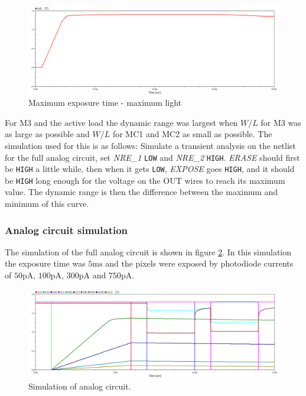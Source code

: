 \begin{figure}
    \centering
    \includegraphics[width=\textwidth]{graphs/maxExp_maxLight.png}
    \caption{Maximum exposure time - maximum light}
    \label{fig:max-max}
\end{figure}

For M3 and the active load the dynamic range was largest when $W/L$ for M3 was as large as possible and $W/L$ for MC1 and MC2 as small as possible. The simulation used for this is as follows: Simulate a transient analysis on the netlist for the full analog circuit, set \emph{NRE\_1} \verb|LOW| and \emph{NRE\_2} \verb|HIGH|. \emph{ERASE} should first be \verb|HIGH| a little while, then when it gets \verb|LOW|, \emph{EXPOSE} goes \verb|HIGH|, and it should be \verb|HIGH| long enough for the voltage on the OUT wires to reach its maximum value. The dynamic range is then the difference between the maximum and minimum of this curve.

\subsubsection{Analog circuit simulation}

The simulation of the full analog circuit is shown in figure \ref{fig:analogWaveform}. In this simulation the exposure time was $5 \mathrm{ms}$ and the pixels were exposed by photodiode currents of $50 \mathrm{pA}$, $100 \mathrm{pA}$, $300 \mathrm{pA}$ and $750 \mathrm{pA}$.

\begin{figure}
    \centering
    \includegraphics[width=\textwidth]{graphs/analogWaveform.png}
    \caption{Simulation of analog circuit.}
    \label{fig:analogWaveform}
\end{figure}

